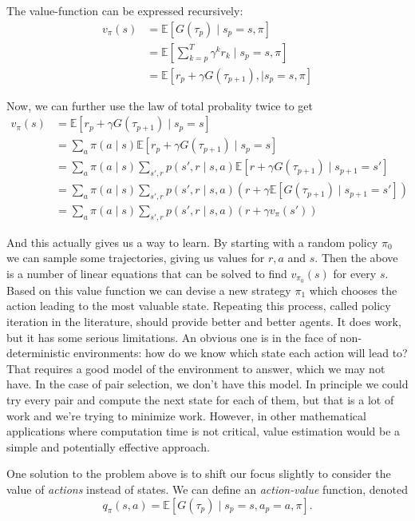 \documentclass{article}
\theoremstyle{changedot}
\theoremstyle{changedotbreak}
\theoremstyle{nonumberplain}
\newcommand{\m}{\mathbb}
\begin{document}
The value-function can be expressed recursively:
\begin{align}
  v_{\pi}(s) &= \m E[G(\tau_{p}) \mid s_{p} = s, \pi] \\
             &= \m E\left[ \sum_{k=p}^{T} \gamma^{k} r_{k} \mid s_{p} = s, \pi \right] \\
  &= \m E \left[ r_{p} + \gamma G(\tau_{p+1}), \mid s_{p} = s, \pi \right]
\end{align}

Now, we can further use the law of total probality twice to get
\begin{align}
  v_{\pi}(s) &= \m E[r_{p} + \gamma G(\tau_{p+1}) \mid s_{p} = s] \\
             &= \sum_{a} \pi(a \mid s) \m E[r_{p} + \gamma G(\tau_{p+1}) \mid s_{p} = s] \\
             &= \sum_{a} \pi(a \mid s) \sum_{s', r} p(s', r \mid s, a) \m E[r + \gamma G(\tau_{p+1}) \mid s_{p+1} = s'] \\
             &= \sum_{a} \pi(a \mid s) \sum_{s', r} p(s', r \mid s, a) ( r + \gamma \m E[G(\tau_{p+1}) \mid s_{p+1} = s'] )\\
             &= \sum_{a} \pi(a \mid s) \sum_{s', r} p(s', r \mid s, a) (r + \gamma v_{\pi}(s'))
\end{align}

And this actually gives us a way to learn. By starting with a random policy $\pi_{0}$ we can sample some trajectories, giving us values for $r, a$ and $s$. Then the above is a number of linear equations that can be solved to find $v_{\pi_{0}}(s)$ for every $s$. Based on this value function we can devise a new strategy $\pi_{1}$ which chooses the action leading to the most valuable state. Repeating this process, called policy iteration in the literature, should provide better and better agents. It does work, but it has some serious limitations. An obvious one is in the face of non-deterministic environments: how do we know which state each action will lead to? That requires a good model of the environment to answer, which we may not have. In the case of pair selection, we don't have this model. In principle we could try every pair and compute the next state for each of them, but that is a lot of work and we're trying to minimize work. However, in other mathematical applications where computation time is not critical, value estimation would be a simple and potentially effective approach.

One solution to the problem above is to shift our focus slightly to consider the value of \emph{actions} instead of states. We can define an \emph{action-value} function, denoted \[q_{\pi}(s, a) = \m E[G(\tau_{p}) \mid s_{p} = s, a_{p} = a, \pi]. \]
\end{document}
